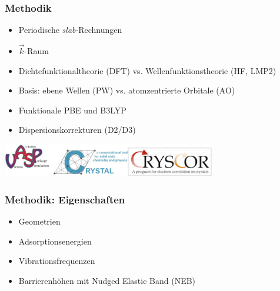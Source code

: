 \documentclass[hyperref={pdfpagelabels=false}]{beamer}
\begin{document}
\begin{frame}
 \frametitle{Methodik}
 \begin{itemize}
  \item Periodische \textit{slab}-Rechnungen
  \item $\vec{k}$-Raum
  \item Dichtefunktionaltheorie (DFT) vs. Wellenfunktionstheorie (HF, LMP2)
  \item Basis: ebene Wellen (PW) vs. atomzentrierte Orbitale (AO)
  \item Funktionale PBE und B3LYP
  \item Dispersionskorrekturen (D2/D3)
 \end{itemize}

 \centering
 \includegraphics[width=0.7\textwidth]{figures/programs-logos.eps}
\end{frame}

\begin{frame}
\frametitle{Methodik: Eigenschaften}
\begin{itemize}
\item Geometrien
\item Adsorptionsenergien
\item Vibrationsfrequenzen
\item Barrierenhöhen mit Nudged Elastic Band (NEB)
\end{itemize}
\end{frame}
\end{document}
